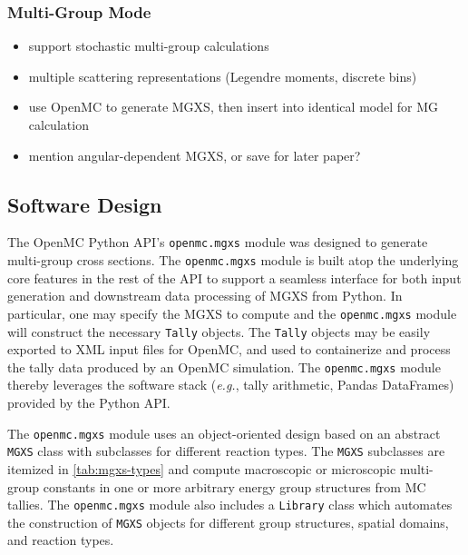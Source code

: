 \subsubsection{Multi-Group Mode}
\label{subsec:openmc-mg-mode}

\begin{itemize}[noitemsep]
\item support stochastic multi-group calculations
\item multiple scattering representations (Legendre moments, discrete bins)
\item use OpenMC to generate MGXS, then insert into identical model for MG calculation
\item mention angular-dependent MGXS, or save for later paper?
\end{itemize}

\subsection{Software Design}
\label{sec:software}

The OpenMC Python API's \texttt{openmc.mgxs} module was designed to generate multi-group cross sections. The \texttt{openmc.mgxs} module is built atop the underlying core features in the rest of the API to support a seamless interface for both input generation and downstream data processing of MGXS from Python. In particular, one may specify the MGXS to compute and the \texttt{openmc.mgxs} module will construct the necessary \texttt{Tally} objects. The \texttt{Tally} objects may be easily exported to XML input files for OpenMC, and used to containerize and process the tally data produced by an OpenMC simulation. The \texttt{openmc.mgxs} module thereby leverages the software stack (\textit{e.g.}, tally arithmetic, Pandas DataFrames) provided by the Python API.

The \texttt{openmc.mgxs} module uses an object-oriented design based on an abstract \texttt{MGXS} class with subclasses for different reaction types. The \texttt{MGXS} subclasses are itemized in \autoref{tab:mgxs-types} and compute macroscopic or microscopic multi-group constants in one or more arbitrary energy group structures from MC tallies. The \texttt{openmc.mgxs} module also includes a \texttt{Library} class which automates the construction of \texttt{MGXS} objects for different group structures, spatial domains, and reaction types.

